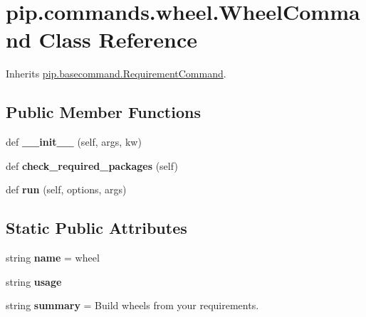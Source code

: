 \hypertarget{classpip_1_1commands_1_1wheel_1_1_wheel_command}{}\section{pip.\+commands.\+wheel.\+Wheel\+Command Class Reference}
\label{classpip_1_1commands_1_1wheel_1_1_wheel_command}


Inherits \hyperlink{classpip_1_1basecommand_1_1_requirement_command}{pip.\+basecommand.\+Requirement\+Command}.

\subsection*{Public Member Functions}
\begin{DoxyCompactItemize}
\item 
\mbox{\label{classpip_1_1commands_1_1wheel_1_1_wheel_command_a1ee7f8f54b879cac04028bdfe0dfe264}} 
def {\bfseries \+\_\+\+\_\+init\+\_\+\+\_\+} (self, args, kw)
\item 
\mbox{\label{classpip_1_1commands_1_1wheel_1_1_wheel_command_abda51d32f037ca7458274263c76c1355}} 
def {\bfseries check\+\_\+required\+\_\+packages} (self)
\item 
\mbox{\label{classpip_1_1commands_1_1wheel_1_1_wheel_command_a296ef735988331c8f6a842717f04420d}} 
def {\bfseries run} (self, options, args)
\end{DoxyCompactItemize}
\subsection*{Static Public Attributes}
\begin{DoxyCompactItemize}
\item 
\mbox{\label{classpip_1_1commands_1_1wheel_1_1_wheel_command_ad7d3e527ccf2ab9d17966bc0744fa8e5}} 
string {\bfseries name} = \textquotesingle{}wheel\textquotesingle{}
\item 
string {\bfseries usage}
\item 
\mbox{\label{classpip_1_1commands_1_1wheel_1_1_wheel_command_a600ad908ed76e2d738a0e512bdc40c33}} 
string {\bfseries summary} = \textquotesingle{}Build wheels from your requirements.\textquotesingle{}
\end{DoxyCompactItemize}
